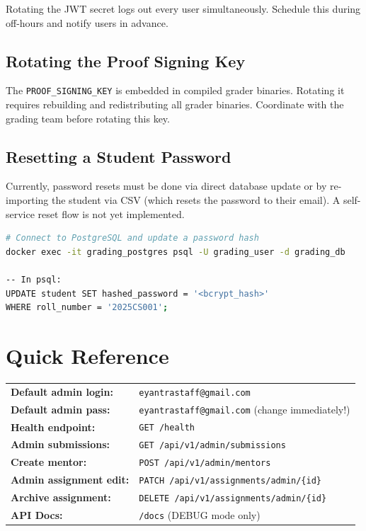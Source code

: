 \documentclass[12pt,a4paper]{article}
\begin{document}
\begin{dangerbox}
  Rotating the JWT secret logs out every user simultaneously. Schedule this during off-hours and notify users in advance.
\end{dangerbox}

\subsection{Rotating the Proof Signing Key}

The \texttt{PROOF\_SIGNING\_KEY} is embedded in compiled grader binaries. Rotating it requires rebuilding and redistributing all grader binaries. Coordinate with the grading team before rotating this key.

\subsection{Resetting a Student Password}

Currently, password resets must be done via direct database update or by re-importing the student via CSV (which resets the password to their email). A self-service reset flow is not yet implemented.

\begin{lstlisting}[language=bash]
# Connect to PostgreSQL and update a password hash
docker exec -it grading_postgres psql -U grading_user -d grading_db

-- In psql:
UPDATE student SET hashed_password = '<bcrypt_hash>' 
WHERE roll_number = '2025CS001';
\end{lstlisting}

\section{Quick Reference}

\begin{tcolorbox}[colback=adminRed!5, colframe=adminRed, title={\faBookmark\enspace Admin Quick Reference}]
\begin{tabular}{ll}
\textbf{Default admin login:}   & \texttt{eyantrastaff@gmail.com} \\
\textbf{Default admin pass:}    & \texttt{eyantrastaff@gmail.com} (change immediately!) \\
\textbf{Health endpoint:}        & \texttt{GET /health} \\
\textbf{Admin submissions:}      & \texttt{GET /api/v1/admin/submissions} \\
\textbf{Create mentor:}          & \texttt{POST /api/v1/admin/mentors} \\
\textbf{Admin assignment edit:}  & \texttt{PATCH /api/v1/assignments/admin/\{id\}} \\
\textbf{Archive assignment:}     & \texttt{DELETE /api/v1/assignments/admin/\{id\}} \\
\textbf{API Docs:}               & \texttt{/docs} (DEBUG mode only) \\
\end{tabular}
\end{tcolorbox}

\end{document}

